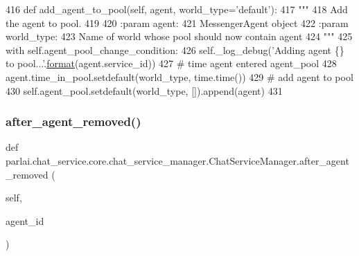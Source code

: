 \begin{DoxyCode}
416     \textcolor{keyword}{def }add\_agent\_to\_pool(self, agent, world\_type='default'):
417         \textcolor{stringliteral}{"""}
418 \textcolor{stringliteral}{        Add the agent to pool.}
419 \textcolor{stringliteral}{}
420 \textcolor{stringliteral}{        :param agent:}
421 \textcolor{stringliteral}{            MessengerAgent object}
422 \textcolor{stringliteral}{        :param world\_type:}
423 \textcolor{stringliteral}{            Name of world whose pool should now contain agent}
424 \textcolor{stringliteral}{        """}
425         with self.agent\_pool\_change\_condition:
426             self.\_log\_debug(\textcolor{stringliteral}{'Adding agent \{\} to pool...'}.\hyperlink{namespaceparlai_1_1chat__service_1_1services_1_1messenger_1_1shared__utils_a32e2e2022b824fbaf80c747160b52a76}{format}(agent.service\_id))
427             \textcolor{comment}{# time agent entered agent\_pool}
428             agent.time\_in\_pool.setdefault(world\_type, time.time())
429             \textcolor{comment}{# add agent to pool}
430             self.agent\_pool.setdefault(world\_type, []).append(agent)
431 
\end{DoxyCode}
\mbox{\label{classparlai_1_1chat__service_1_1core_1_1chat__service__manager_1_1ChatServiceManager_a928461831de4bdb9fb240ae538d0b841}} 
\subsubsection{\texorpdfstring{after\+\_\+agent\+\_\+removed()}{after\_agent\_removed()}}
{\footnotesize\ttfamily def parlai.\+chat\+\_\+service.\+core.\+chat\+\_\+service\+\_\+manager.\+Chat\+Service\+Manager.\+after\+\_\+agent\+\_\+removed (\begin{DoxyParamCaption}\item[{}]{self,  }\item[{}]{agent\+\_\+id }\end{DoxyParamCaption})}

